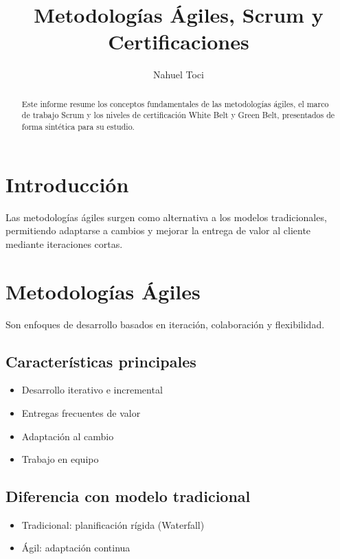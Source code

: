 \documentclass{llncs}
\begin{document}
\title{Metodologías Ágiles, Scrum y Certificaciones}
\author{Nahuel Toci}

\maketitle

\begin{abstract}
Este informe resume los conceptos fundamentales de las metodologías ágiles, el marco de trabajo Scrum y los niveles de certificación White Belt y Green Belt, presentados de forma sintética para su estudio.
\end{abstract}

\section{Introducción}
Las metodologías ágiles surgen como alternativa a los modelos tradicionales, permitiendo adaptarse a cambios y mejorar la entrega de valor al cliente mediante iteraciones cortas.

\section{Metodologías Ágiles}
Son enfoques de desarrollo basados en iteración, colaboración y flexibilidad.

\subsection{Características principales}
\begin{itemize}
\item Desarrollo iterativo e incremental
\item Entregas frecuentes de valor
\item Adaptación al cambio
\item Trabajo en equipo
\end{itemize}

\subsection{Diferencia con modelo tradicional}
\begin{itemize}
\item Tradicional: planificación rígida (Waterfall)
\item Ágil: adaptación continua
\end{itemize}
\end{document}
